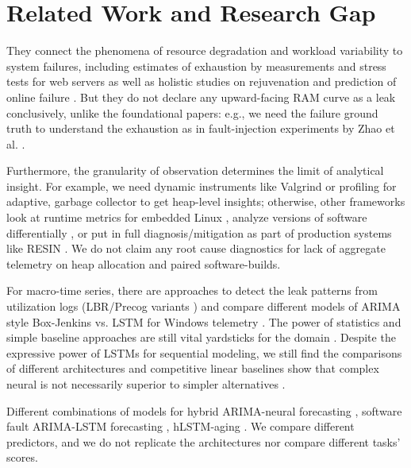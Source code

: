 \documentclass{llncs}
\begin{document}
\section{Related Work and Research Gap}
They connect the phenomena of resource degradation and workload variability to system failures, including estimates of exhaustion by measurements \cite{ref8} and stress tests for web servers \cite{ref9} as well as holistic studies on rejuvenation and prediction of online failure \cite{ref10,ref22}. But they do not declare any upward-facing RAM curve as a leak conclusively, unlike the foundational papers: e.g., we need the failure ground truth to understand the exhaustion as in fault-injection experiments by Zhao et al. \cite{ref11}.

Furthermore, the granularity of observation determines the limit of analytical insight. For example, we need dynamic instruments like Valgrind \cite{ref12} or profiling for adaptive, garbage collector \cite{ref14,ref17} to get heap-level insights; otherwise, other frameworks look at runtime metrics for embedded Linux \cite{ref19}, analyze versions of software differentially \cite{ref20}, or put in full diagnosis/mitigation as part of production systems like RESIN \cite{ref21}. We do not claim any root cause diagnostics for lack of aggregate telemetry on heap allocation and paired software-builds.

For macro-time series, there are approaches to detect the leak patterns from utilization logs (LBR/Precog variants \cite{ref1}) and compare different models of ARIMA style Box-Jenkins vs. LSTM for Windows telemetry \cite{ref2}. The power of statistics and simple baseline approaches are still vital yardsticks for the domain \cite{ref24,ref25}. Despite the expressive power of LSTMs for sequential modeling\cite{ref26}, we still find the comparisons of different architectures and competitive linear baselines show that complex neural is not necessarily superior to simpler alternatives \cite{ref28,ref32}.

Different combinations of models for hybrid ARIMA-neural forecasting \cite{ref29}, software fault ARIMA-LSTM forecasting \cite{ref30}, hLSTM-aging \cite{ref31}. We compare different predictors, and we do not replicate the architectures nor compare different tasks' scores.
\end{document}
